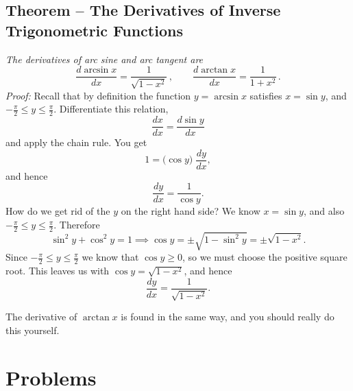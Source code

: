 \subsection{Theorem -- The Derivatives of Inverse Trigonometric Functions}
\textit{ The derivatives of arc sine and arc tangent are }
\[
  \frac{d\arcsin x}{dx} = \frac 1{\sqrt{1-x^2}}\,, \qquad
  \frac{d\arctan x}{dx} = \frac 1{1+x^2}\,.
\]
\textit{Proof: } Recall that by definition the function $y =\arcsin x$
satisfies $x=\sin y$, and $-\frac\pi2 \leq y \leq \frac\pi2$.
Differentiate this relation,
\[
\frac{dx}{dx} = \frac{d\sin y}{dx}
\]
and apply the chain rule.  You get
\[
1 = \bigl(\cos y\bigr)\; \frac{dy}{dx},
\]
and hence
\[
\frac{dy}{dx} = \frac1{\cos y}.
\]
How do we get rid of the $y$ on the right hand side? We know $x=\sin
y$, and also $-\frac\pi2\leq y \leq \frac\pi2$.  Therefore
\[
\sin^2 y + \cos^2 y = 1 \implies \cos y = \pm\sqrt{1-\sin^2y} =
\pm\sqrt{1-x^2}.
\]
Since $-\frac\pi2\leq y \leq \frac\pi2$ we know that $\cos y\geq 0$,
so we must choose the positive square root.  This leaves us with $\cos
y = \sqrt{1-x^2}$, and hence
\[
\frac{dy}{dx} = \frac1{\sqrt{1-x^2}}.
\]

The derivative of $\arctan x$ is found in the same way, and you should
really do this yourself.

\section{Problems}
\problemfont

